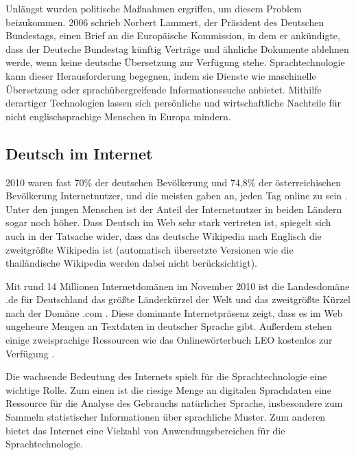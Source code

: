 \documentclass[]{../../metanetpaper}
\begin{document}
\begin{multicols}{2}
Unlängst wurden politische Maßnahmen ergriffen, um diesem Problem beizukommen. 2006 schrieb Norbert Lammert, der Präsident des Deutschen Bundestags, einen Brief an die Europäische Kommission, in dem er ankündigte, dass der Deutsche Bundestag künftig Verträge und ähnliche Dokumente ablehnen werde, wenn keine deutsche Übersetzung zur Verfügung stehe. Sprachtechnologie kann dieser Herausforderung begegnen, indem sie Dienste wie maschinelle Übersetzung oder sprachübergreifende Informationssuche anbietet. Mithilfe derartiger Technologien lassen sich persönliche und wirtschaftliche Nachteile für nicht englischsprachige Menschen in Europa mindern.


\subsection{Deutsch im Internet}

2010 waren fast 70\% der deutschen Bevölkerung und 74,8\% der österreichischen Bevölkerung Internetnutzer, und die meisten gaben an, jeden Tag online zu sein \cite{ard1,ict1}. Unter den jungen Menschen ist der Anteil der Internetnutzer in beiden Ländern sogar noch höher. Dass Deutsch im Web sehr stark vertreten ist, spiegelt sich auch in der Tatsache wider, dass das deutsche Wikipedia nach Englisch die zweitgrößte Wikipedia ist (automatisch übersetzte Versionen wie die thailändische Wikipedia werden dabei nicht berücksichtigt).


Mit rund 14 Millionen Internetdomänen im November 2010 ist die Landesdomäne .de für Deutschland das größte Länderkürzel der Welt und das zweitgrößte Kürzel nach der Domäne .com \cite{denic1,ebrands1}. Diese dominante Internetpräsenz zeigt, dass es im Web ungeheure Mengen an Textdaten in deutscher Sprache gibt. Außerdem stehen einige zweisprachige Ressourcen wie das Onlinewörterbuch LEO kostenlos zur Verfügung \cite{leo1}.

Die wachsende Bedeutung des Internets spielt für die Sprachtechnologie eine wichtige Rolle. Zum einen ist die riesige Menge an digitalen Sprachdaten eine Ressource für die Analyse des Gebrauchs natürlicher Sprache, insbesondere zum Sammeln statistischer Informationen über sprachliche Muster. Zum anderen bietet das Internet eine Vielzahl von Anwendungsbereichen für die Sprachtechnologie.


\end{multicols}
\end{document}

